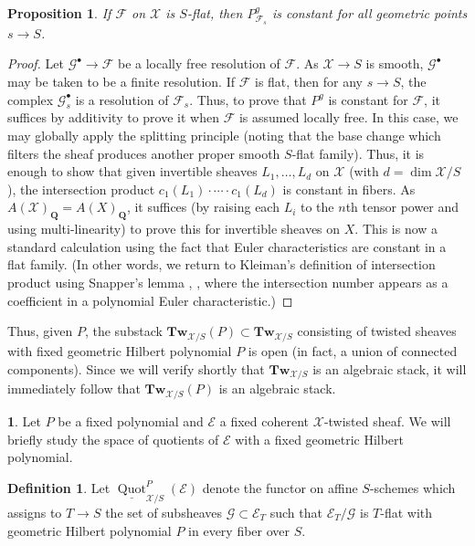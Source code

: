 \documentclass[11pt]{amsart}
\newcommand{\field}[1]{\mathbf #1}
\newcommand{\ms}[1]{\mathscr #1}
\newcommand{\Q}{\field Q}
\DeclareMathOperator{\quot}{Quot}
\renewcommand{\[}{[\!\hspace{0.03em}[}
\renewcommand{\]}{]\!\hspace{0.03em}]}
\renewcommand{\(}{(\!\hspace{0.03em}(}
\renewcommand{\)}{)\!\hspace{0.03em})}
\newcommand{\Tw}{\mathbf{Tw}}
\newtheorem{prop}[lem]{Proposition}
\theoremstyle{definition}
\newtheorem{defn}[lem]{Definition}
\newtheorem{para}[lem]{\indent}
\theoremstyle{remark}
\begin{document}
\begin{prop}\label{P:hilb poly constant} If $\ms F$ on $\ms X$ is $S$-flat, then $P^{g}_{\ms 
F_{s}}$ is constant for all geometric points $s\to S$.
\end{prop}
\begin{proof} Let $\ms G^{\bullet}\to\ms F$ be a locally free 
resolution of $\ms F$.  As $\ms X\to S$ is smooth, $\ms G^{\bullet}$ 
may be taken to be a finite resolution.  If $\ms F$ is flat, then for 
any $s\to S$, the complex $\ms G^{\bullet}_{s}$ is a resolution of $\ms 
F_{s}$.  Thus, to prove that $P^{g}$ is constant for $\ms F$, it 
suffices by additivity to prove it when $\ms F$ is assumed locally 
free.  In this case, we may globally apply the splitting principle 
(noting that the base change which filters the sheaf produces another 
proper smooth $S$-flat family).  Thus, it is enough to show that given 
invertible sheaves $L_{1},\ldots,L_{d}$ on $\ms X$ (with $d=\dim\ms 
X/S$), the intersection 
product $c_{1}(L_{1})\cdot\cdots\cdot c_{1}(L_{d})$ is constant in 
fibers.  As $A(\ms X)_{\Q}=A(X)_{\Q}$, it suffices (by raising each 
$L_{i}$ to the $n$th tensor power and using multi-linearity) to prove this for 
invertible sheaves on $X$.  This is now a standard calculation using 
the fact that Euler characteristics are constant in a flat family.  
(In other words, we return to Kleiman's definition of intersection product 
using Snapper's lemma \cite[\S1]{badescu}, \cite{kleiman}, where the intersection number appears as 
a coefficient in a polynomial Euler characteristic.)
\end{proof}
Thus, given $P$, the substack $\Tw_{\ms X/S}(P)\subset\Tw_{\ms X/S}$ 
consisting of twisted sheaves with fixed geometric Hilbert 
polynomial $P$ is open (in fact, a union of connected components).  
Since we will verify shortly that $\Tw_{\ms X/S}$ is an algebraic stack, it will immediately follow that $\Tw_{\ms X/S}(P)$ is an algebraic stack.

\begin{para} Let $P$ be a fixed polynomial and $\ms E$ a fixed coherent $\ms 
X$-twisted sheaf.  We will briefly study the space of quotients of 
$\ms E$ with a fixed geometric Hilbert polynomial.
\end{para}

\begin{defn} Let $\underline{\quot}^{P}_{\ms X/S}(\ms E)$ denote the 
functor on affine $S$-schemes which assigns to $T\to S$ the set of 
subsheaves $\ms G\subset\ms E_{T}$ such that $\ms E_{T}/\ms G$ is 
$T$-flat with geometric Hilbert polynomial $P$ in every fiber over $S$.
\end{defn}
\end{document}
